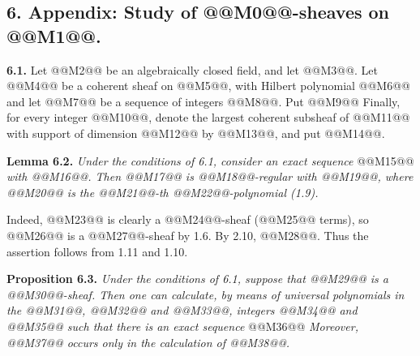 \subsection*{6. Appendix: Study of @@M0@@-sheaves on @@M1@@.}

\textbf{6.1.} Let @@M2@@ be an algebraically closed field, and let @@M3@@. Let @@M4@@ be a coherent sheaf on @@M5@@, with Hilbert polynomial
@@M6@@
and let
@@M7@@
be a sequence of integers @@M8@@. Put
@@M9@@
Finally, for every integer @@M10@@, denote the largest coherent subsheaf of @@M11@@ with support of dimension @@M12@@ by @@M13@@, and put @@M14@@.

\textbf{Lemma 6.2.} \emph{Under the conditions of 6.1, consider an exact sequence}
@@M15@@
\emph{with @@M16@@. Then @@M17@@ is @@M18@@-regular with @@M19@@, where @@M20@@ is the @@M21@@-th @@M22@@-polynomial (1.9).}

Indeed, @@M23@@ is clearly a @@M24@@-sheaf (@@M25@@ terms), so @@M26@@ is a @@M27@@-sheaf by 1.6. By 2.10, @@M28@@. Thus the assertion follows from 1.11 and 1.10.

\textbf{Proposition 6.3.} \emph{Under the conditions of 6.1, suppose that @@M29@@ is a @@M30@@-sheaf. Then one can calculate, by means of universal polynomials in the @@M31@@, @@M32@@ and @@M33@@, integers @@M34@@ and @@M35@@ such that there is an exact sequence}
@@M36@@
\emph{Moreover, @@M37@@ occurs only in the calculation of @@M38@@.}

